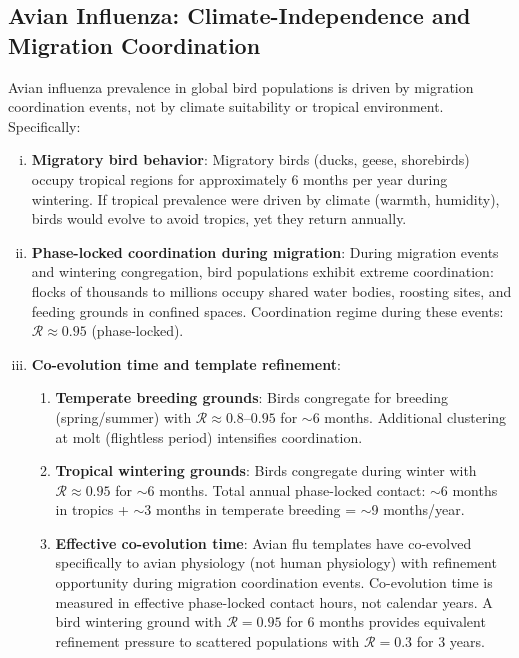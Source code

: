 \documentclass[11pt,twocolumn,a4paper]{article}
\newcommand{\Coord}{\mathcal{R}}
\begin{document}
\subsection{Avian Influenza: Climate-Independence and Migration Coordination}

\begin{theorem}
\label{thm:avian_flu}
Avian influenza prevalence in global bird populations is driven by migration coordination events, not by climate suitability or tropical environment. Specifically:

\begin{enumerate}[(i)]
\item \textbf{Migratory bird behavior}: Migratory birds (ducks, geese, shorebirds) occupy tropical regions for approximately 6 months per year during wintering. If tropical prevalence were driven by climate (warmth, humidity), birds would evolve to avoid tropics, yet they return annually.

\item \textbf{Phase-locked coordination during migration}: During migration events and wintering congregation, bird populations exhibit extreme coordination: flocks of thousands to millions occupy shared water bodies, roosting sites, and feeding grounds in confined spaces. Coordination regime during these events: $\Coord \approx 0.95$ (phase-locked).

\item \textbf{Co-evolution time and template refinement}:
\begin{enumerate}
\item \textbf{Temperate breeding grounds}: Birds congregate for breeding (spring/summer) with $\Coord \approx 0.8$--$0.95$ for $\sim$6 months. Additional clustering at molt (flightless period) intensifies coordination.
\item \textbf{Tropical wintering grounds}: Birds congregate during winter with $\Coord \approx 0.95$ for $\sim$6 months. Total annual phase-locked contact: $\sim$6 months in tropics + $\sim$3 months in temperate breeding = $\sim$9 months/year.
\item \textbf{Effective co-evolution time}: Avian flu templates have co-evolved specifically to avian physiology (not human physiology) with refinement opportunity during migration coordination events. Co-evolution time is measured in effective phase-locked contact hours, not calendar years. A bird wintering ground with $\Coord = 0.95$ for 6 months provides equivalent refinement pressure to scattered populations with $\Coord = 0.3$ for 3 years.
\end{enumerate}


\end{enumerate}
\end{theorem}
\end{document}
